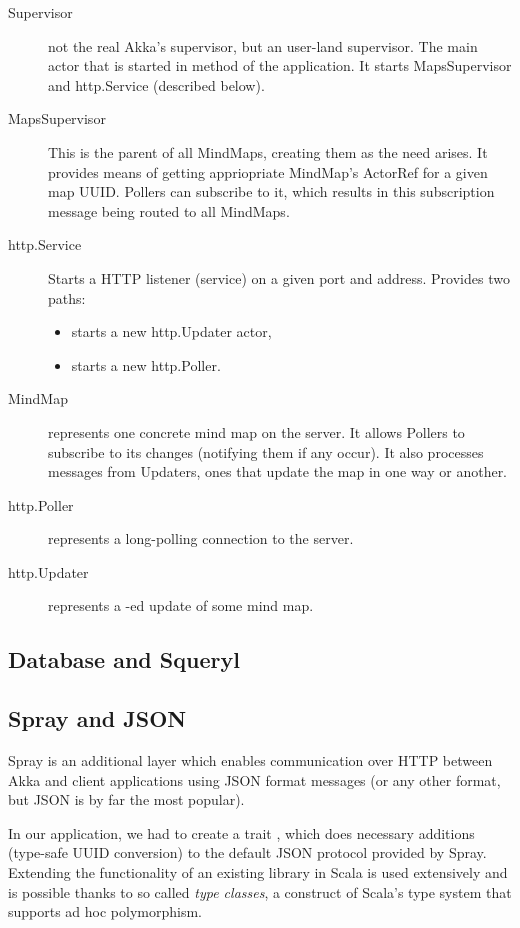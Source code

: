 \begin{description}
	\item[Supervisor] not the real Akka's supervisor, but an user-land supervisor. The main actor that is started in  method of the application. It starts MapsSupervisor and http.Service (described below).
	\item[MapsSupervisor] This is the parent of all MindMaps, creating them as the need arises. It provides means of getting appriopriate MindMap's ActorRef for a given map UUID. Pollers can subscribe to it, which results in this subscription message being routed to all MindMaps.
	\item[http.Service] Starts a HTTP listener (service) on a given port and address. Provides two paths: \begin{itemize}
		\item {} starts a new http.Updater actor,
		\item {} starts a new http.Poller.
	\end{itemize}
	\item[MindMap] represents one concrete mind map on the server. It allows Pollers to subscribe to its changes (notifying them if any occur). It also processes messages from Updaters, ones that update the map in one way or another.
	\item[http.Poller] represents a long-polling connection to the server.
	\item[http.Updater] represents a -ed update of some mind map.
\end{description}

\subsection{Database and Squeryl}
\label{subsection:akka-database}


\subsection{Spray and JSON}
\label{subsection:akka-spray}
Spray is an additional layer which enables communication over HTTP between Akka and client applications using JSON format messages (or any other format, but JSON is by far the most popular).

In our application, we had to create a trait , which does necessary additions (type-safe UUID conversion) to the default JSON protocol provided by Spray. Extending the functionality of an existing library in Scala is used extensively and is possible thanks to so called \emph{type classes}, a construct of Scala's type system that supports ad hoc polymorphism.

